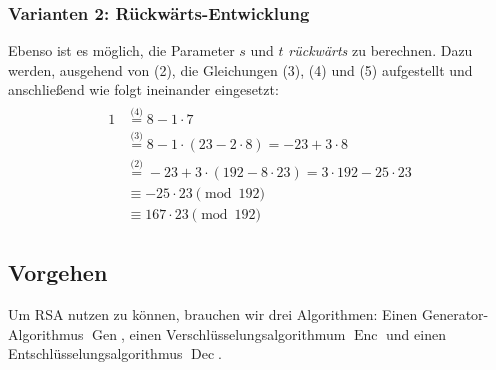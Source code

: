 \begin{beispiel}[EEA]
    \subsubsection*{Varianten 2: Rückwärts-Entwicklung}
    Ebenso ist es möglich, die Parameter $s$ und $t$ \emph{rückwärts} zu berechnen. Dazu werden, ausgehend von (2), 
    die Gleichungen (3), (4) und (5) aufgestellt und anschließend wie folgt ineinander eingesetzt:  
    \begin{align*}
      \begin{split}
        1	&\stackrel{\textit{(4)}}{=} 8 - 1 \cdot 7\\
        &\stackrel{\textit{(3)}}{=} 8 - 1 \cdot (23 - 2 \cdot 8) = -23 + 3 \cdot 8\\
        &\stackrel{\textit{(2)}}{=} -23 + 3 \cdot (192 - 8 \cdot 23) = 3 \cdot 192 - 25 \cdot 23\\[.5cm]
        &\equiv -25 \cdot 23 \pmod{192}\\
        &\equiv 167 \cdot 23 \pmod{192}
      \end{split}
    \end{align*}
  \end{beispiel}
  

\subsection{Vorgehen}
\label{ch:asymmenc:rsa:vorgehen}
Um RSA nutzen zu können, brauchen wir drei Algorithmen: Einen
Generator-Algorithmus $\operatorname{Gen}$, einen
Verschlüsselungsalgorithmum $\operatorname{Enc}$ und einen
Entschlüsselungsalgorithmus $\operatorname{Dec}$.
